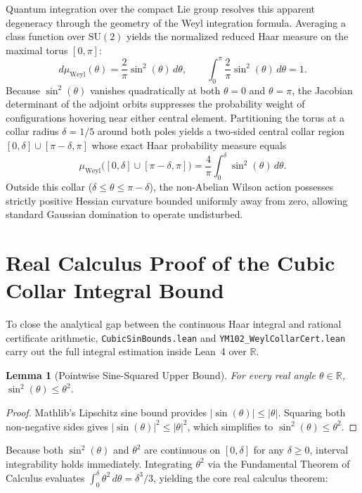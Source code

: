 \documentclass[11pt,a4paper]{article}
\newtheorem{lemma}[theorem]{Lemma}
\newcommand{\R}{\mathbb{R}}
\newcommand{\SU}{\mathrm{SU}}
\begin{document}
Quantum integration over the compact Lie group resolves this apparent degeneracy through the geometry of the Weyl integration formula. Averaging a class function over $\SU(2)$ yields the normalized reduced Haar measure on the maximal torus $[0, \pi]$:
\begin{equation}
d\mu_{\mathrm{Weyl}}(\theta) = \frac{2}{\pi} \sin^2(\theta) \, d\theta, \qquad \int_0^\pi \frac{2}{\pi} \sin^2(\theta) \, d\theta = 1.
\end{equation}
Because $\sin^2(\theta)$ vanishes quadratically at both $\theta = 0$ and $\theta = \pi$, the Jacobian determinant of the adjoint orbits suppresses the probability weight of configurations hovering near either central element. Partitioning the torus at a collar radius $\delta = 1/5$ around both poles yields a two-sided central collar region $[0, \delta] \cup [\pi - \delta, \pi]$ whose exact Haar probability measure equals
\begin{equation}
\mu_{\mathrm{Weyl}}\bigl([0, \delta] \cup [\pi - \delta, \pi]\bigr) = \frac{4}{\pi} \int_0^\delta \sin^2(\theta) \, d\theta.
\end{equation}
Outside this collar ($\delta \le \theta \le \pi - \delta$), the non-Abelian Wilson action possesses strictly positive Hessian curvature bounded uniformly away from zero, allowing standard Gaussian domination to operate undisturbed.

\section{Real Calculus Proof of the Cubic Collar Integral Bound}
To close the analytical gap between the continuous Haar integral and rational certificate arithmetic, \texttt{CubicSinBounds.lean} and \texttt{YM102\_\-WeylCollarCert.lean} carry out the full integral estimation inside Lean~4 over $\R$.

\begin{lemma}[Pointwise Sine-Squared Upper Bound]
For every real angle $\theta \in \R$, $\sin^2(\theta) \le \theta^2$.
\end{lemma}

\begin{proof}
Mathlib's Lipschitz sine bound provides $|\sin(\theta)| \le |\theta|$. Squaring both non-negative sides gives $|\sin(\theta)|^2 \le |\theta|^2$, which simplifies to $\sin^2(\theta) \le \theta^2$.
\end{proof}

Because both $\sin^2(\theta)$ and $\theta^2$ are continuous on $[0, \delta]$ for any $\delta \ge 0$, interval integrability holds immediately. Integrating $\theta^2$ via the Fundamental Theorem of Calculus evaluates $\int_0^\delta \theta^2 \, d\theta = \delta^3 / 3$, yielding the core real calculus theorem:
\end{document}

